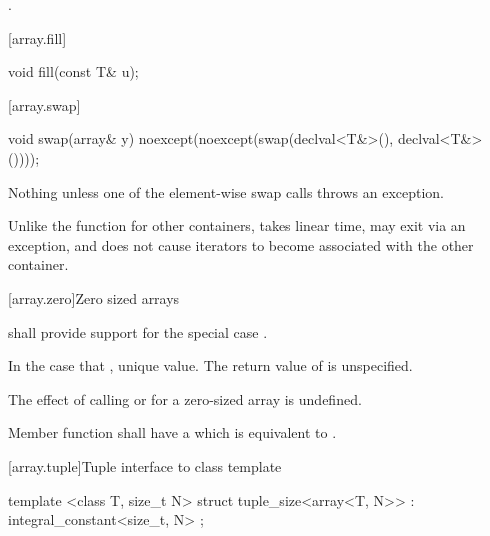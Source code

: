 \begin{itemdescr}
\pnum \returns {}.
\end{itemdescr}

[array.fill]{}

%
%
\begin{itemdecl}
void fill(const T& u);
\end{itemdecl}

\begin{itemdescr}
\pnum
\effects {}
\end{itemdescr}

[array.swap]{}

%
%
\begin{itemdecl}
void swap(array& y) noexcept(noexcept(swap(declval<T&>(), declval<T&>())));
\end{itemdecl}

\begin{itemdescr}
\pnum
\effects {}

\pnum
\throws Nothing unless one of the element-wise swap calls throws an exception.

\pnum
\realnote Unlike the  function for other containers, 
takes linear time, may exit via an exception, and does not cause iterators to
become associated with the other container.
\end{itemdescr}

[array.zero]{Zero sized arrays}

%
\pnum{} shall provide support for the special case .

\pnum In the case that ,  unique value.
The return value of  is unspecified.

\pnum
The effect of calling  or  for a zero-sized array is
undefined.

\pnum
Member function  shall have a 
which is equivalent to .

[array.tuple]{Tuple interface to class template }
%
%
%
%
\begin{itemdecl}
template <class T, size_t N>
  struct tuple_size<array<T, N>> : integral_constant<size_t, N> { };
\end{itemdecl}

